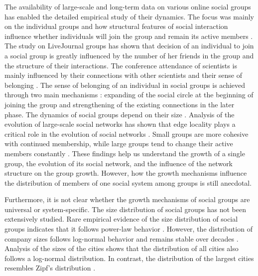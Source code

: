 The availability of large-scale and long-term data on various online social groups has enabled the detailed empirical study of their dynamics. The focus was mainly on the individual groups and how structural features of social interaction influence whether individuals will join the group \cite{backstrom2006group} and remain its active members \cite{smiljanic2016theoretical, smiljanic2017associative}. The study on LiveJournal \cite{backstrom2006group} groups has shown that decision of an individual to join a social group is greatly influenced by the number of her friends in the group and the structure of their interactions. The conference attendance of scientists is mainly influenced by their connections with other scientists and their sense of belonging \cite{smiljanic2016theoretical}. The sense of belonging of an individual in social groups is achieved through two main mechanisms \cite{smiljanic2017associative}: expanding of the social circle at the beginning of joining the group and strengthening of the existing connections in the later phase. The dynamics of social groups depend on their size \cite{}. Analysis of the evolution of large-scale social networks has shown that edge locality plays a critical role in the evolution of social networks \cite{leskovec2008microscopic}. Small groups are more cohesive with continued membership, while large groups tend to change their active members constantly \cite{PNAS}. These findings help us understand the growth of a single group, the evolution of its social network, and the influence of the network structure on the group growth. However, how the growth mechanisms influence the distribution of members of one social system among groups is still anecdotal.

Furthermore, it is not clear whether the growth mechanisms of social groups are universal or system-specific. The size distribution of social groups has not been extensively studied. Rare empirical evidence of the size distribution of social groups indicates that it follows power-law behavior \cite{zheleva2009co}. However, the distribution of company sizes follows log-normal behavior and remains stable over decades \cite{amaral1997scaling, stanley1996scaling}. Analysis of the sizes of the cities shows that the distribution of all cities also follows a log-normal distribution. In contrast, the distribution of the largest cities resembles Zipf's distribution \cite{fazio2015pareto}.

